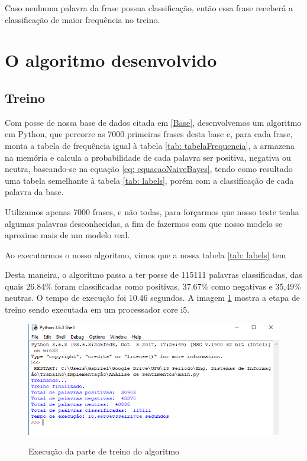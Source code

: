 \documentclass[
article,			%
12pt,				%
a4paper,			%
english,			%
brazil,				%
sumario=tradicional,
twoside
]{abntex2}
\begin{document}
	Caso nenhuma palavra da frase possua classificação, então essa frase receberá a classificação de maior frequência no treino.
	
	\section{O algoritmo desenvolvido}
	
	\subsection{Treino}
	
	Com posse de nossa base de dados citada em \ref{Base}, desenvolvemos um algoritmo em Python, que percorre as 7000 primeiras frases desta base e, para cada frase, monta a tabela de frequência igual à tabela \ref{tab: tabelaFrequencia}, a armazena na memória e calcula a probabilidade de cada palavra ser positiva, negativa ou neutra, baseando-se na equação \ref{eq: equacaoNaiveBayes}, tendo como resultado uma tabela semelhante à tabela \ref{tab: labels}, porém com a classificação de cada palavra da base.
	
	Utilizamos apenas 7000 frases, e não todas, para forçarmos que nosso teste tenha algumas palavras desconhecidas, a fim de fazermos com que nosso modelo se aproxime mais de um modelo real.
	
	Ao executarmos o nosso algoritmo, vimos que a nossa tabela \ref{tab: labels} tem 
	
	Desta maneira, o algoritmo passa a ter posse de 115111 palavras classificadas, das quais 26.84\% foram classificadas como positivas, 37.67\% como negativas e 35,49\% neutras.
	O tempo de execução foi 10.46 segundos. A imagem \ref{fig: treino} mostra a etapa de treino sendo executada em um processador core i5.
	
	\begin{figure}[h!]
		\centering
		\caption{Execução da parte de treino do algoritmo}
		\includegraphics[scale=1]{treino.png}
		\label{fig: treino}
	\end{figure}
	
\end{document}
